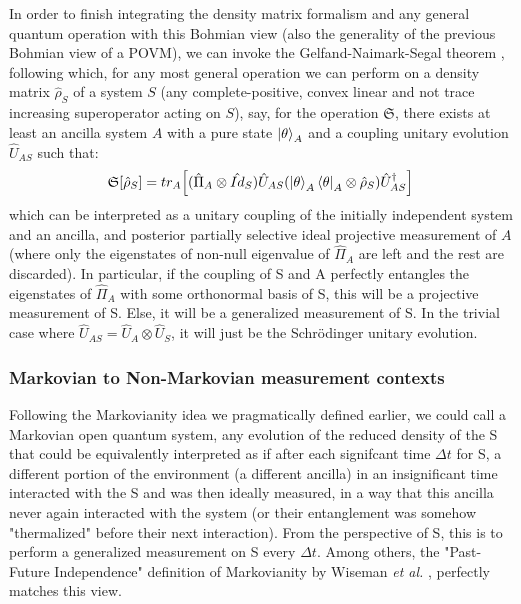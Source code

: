 \documentclass[11pt, a4paper]{article} %
\begin{document}
In order to finish integrating the density matrix formalism and any general quantum operation with this Bohmian view (also the generality of the previous Bohmian view of a POVM), we can invoke the Gelfand-Naimark-Segal theorem \cite{GNSTheorem, Generalized}, following which, for any most general operation we can perform on a density matrix $\hat{\rho}_S$ of a system $S$ (any complete-positive, convex linear and not trace increasing superoperator acting on $S$), say, for the operation $\mathfrak{S}$, there exists at least an ancilla system $A$ with a pure state $\ket{\theta}_A$ and a coupling unitary evolution $\hat{U}_{AS}$ such that:
\begin{equation}
\mathfrak{S}[\hat{\rho}_S]=tr_A\qty[ (\hat{\Pi}_A\otimes \hat{Id}_S)  \hat{U}_{AS}\qty(\ket{\theta}_A\bra{\theta}_A\otimes \hat{\rho}_S)\hat{U}_{AS}^\dagger]
\end{equation}
which can be interpreted as a unitary coupling of the initially independent system and an ancilla, and posterior partially selective ideal projective measurement of $A$ (where only the eigenstates of non-null eigenvalue of $\hat{\Pi}_A$ are left and the rest are discarded). In particular, if the coupling of S and A perfectly entangles the eigenstates of $\hat{\Pi}_A$ with some orthonormal basis of S, this will be a projective measurement of S. Else, it will be a generalized measurement of S. In the trivial case where $\hat{U}_{AS}=\hat{U}_A\otimes\hat{U}_S$, it will just be the Schrödinger unitary evolution.


\subsubsection*{Markovian to Non-Markovian measurement contexts}
Following the Markovianity idea we pragmatically defined earlier, we could call a Markovian open quantum system, any evolution of the reduced density of the S that could be equivalently interpreted as if after each signifcant time $\Delta t$ for S, a different portion of the environment (a different ancilla) in an insignificant time interacted with the S and was then ideally measured, in a way that this ancilla never again interacted with the system (or their entanglement was somehow "thermalized" before their next interaction). From the perspective of S, this is to perform a generalized measurement on S every $\Delta t$. Among others, the "Past-Future Independence" definition of Markovianity by Wiseman {\em et al.} \cite{MarkovianityDefs}, perfectly matches this view.
\end{document}
